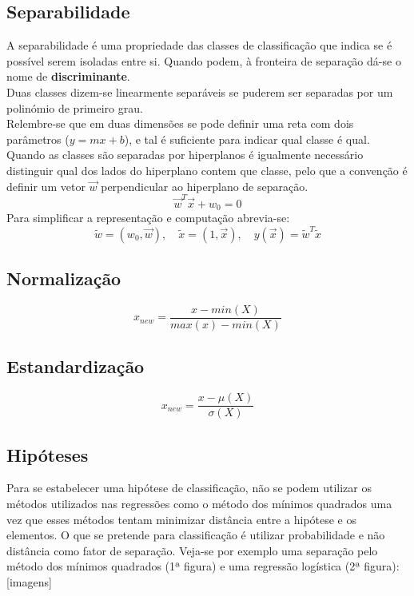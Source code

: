 \documentclass[]{report}
\begin{document}
\subsection{Separabilidade}
A separabilidade é uma propriedade das classes de classificação que indica se é possível serem isoladas entre si. Quando podem, à fronteira de separação dá-se o nome de \textbf{discriminante}.\\
Duas classes dizem-se linearmente separáveis se puderem ser separadas por um polinómio de primeiro grau.\\[0.5cm]
Relembre-se que em duas dimensões se pode definir uma reta com dois parâmetros ($y=mx+b$), e tal é suficiente para indicar qual classe é qual. Quando as classes são separadas por hiperplanos é igualmente necessário distinguir qual dos lados do hiperplano contem que classe, pelo que a convenção é definir um vetor $\vec w$ perpendicular ao hiperplano de separação.
$$\vec w^T \vec x + w_0 = 0$$
Para simplificar a representação e computação abrevia-se:
$$\widetilde{w} = (w_0, \vec w),\quad \widetilde x = (1, \vec x),\quad y(\vec x) = \widetilde w^T \widetilde x$$
\subsection{Normalização}
$$x_{new} = \frac{x-min(X)}{max(x)-min(X)}$$
\subsection{Estandardização}
$$x_{new} = \frac{x - \mu(X)}{\sigma(X)}$$
\subsection{Hipóteses}
Para se estabelecer uma hipótese de classificação, não se podem utilizar os métodos utilizados nas regressões como o método dos mínimos quadrados uma vez que esses métodos tentam minimizar distância entre a hipótese e os elementos.
O que se pretende para classificação é utilizar probabilidade e não distância como fator de separação.
Veja-se por exemplo uma separação pelo método dos mínimos quadrados (1ª figura) e uma regressão logística (2ª figura):[imagens]
\end{document}

